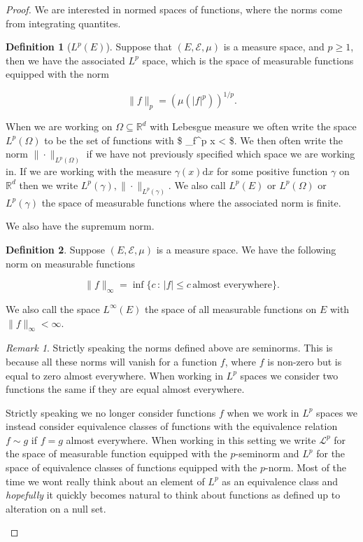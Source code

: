 \documentclass[
]{book}
\theoremstyle{definition}
\newtheorem{definition}{Definition}[chapter]
\theoremstyle{definition}
\theoremstyle{definition}
\theoremstyle{definition}
\theoremstyle{remark}
\newtheorem*{remark}{Remark}
\begin{document}
\begin{proof}
We are interested in normed spaces of functions, where the norms come from integrating quantites.

\begin{definition}[$L^p(E)$]
Suppose that \((E, \mathcal{E}, \mu)\) is a measure space, and \(p \geq 1\), then we have the associated \(L^p\) space, which is the space of measurable functions equipped with the norm

\[ \| f\|_p = \left( \mu(|f|^p)\right)^{1/p}. \]

When we are working on \(\Omega \subseteq \mathbb{R}^d\) with Lebesgue measure we often write the space \(L^p(\Omega)\) to be the set of functions with \$ \int\_\Omega \textbar f\textbar\^{}p x \textless{} \infty\$. We then often write the norm \(\| \cdot\|_{L^p(\Omega)}\) if we have not previously specified which space we are working in. If we are working with the measure \(\gamma(x) \mathrm{d}x\) for some positive function \(\gamma\) on \(\mathbb{R}^d\) then we write \(L^p(\gamma), \| \cdot\|_{L^p(\gamma)}\). We also call \(L^p(E)\) or \(L^p(\Omega)\) or \(L^p(\gamma)\) the space of measurable functions where the associated norm is finite.
\end{definition}

We also have the supremum norm.

\begin{definition}
Suppose \((E, \mathcal{E}, \mu)\) is a measure space. We have the following norm on measurable functions

\[ \|f\|_\infty = \inf \{ c \,:\, |f| \leq c \, \mbox{almost everywhere}\}. \]

We also call the space \(L^\infty(E)\) the space of all measurable functions on \(E\) with \(\|f\|_\infty < \infty\).
\end{definition}

\begin{remark}
Strictly speaking the norms defined above are seminorms. This is because all these norms will vanish for a function \(f\), where \(f\) is non-zero but is equal to zero almost everywhere. When working in \(L^p\) spaces we consider two functions the same if they are equal almost everywhere.

Strictly speaking we no longer consider functions \(f\) when we work in \(L^p\) spaces we instead consider equivalence classes of functions with the equivalence relation \(f \sim g\) if \(f=g\) almost everywhere. When working in this setting we write \(\mathcal{L}^p\) for the space of measurable function equipped with the \(p\)-seminorm and \(L^p\) for the space of equivalence classes of functions equipped with the \(p\)-norm. Most of the time we wont really think about an element of \(L^p\) as an equivalence class and \emph{hopefully} it quickly becomes natural to think about functions as defined up to alteration on a null set.
\end{remark}


\end{proof}
\end{document}
